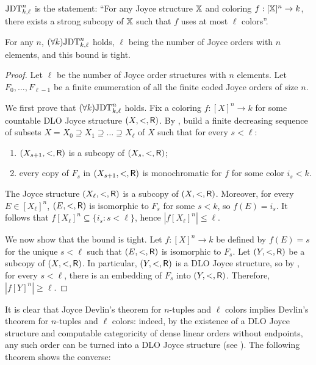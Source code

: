 \begin{statement}
  $\mathrm{JDT}^{n}_{k, \ell}$ is the statement: ``For any Joyce structure $\mathbb{X}$ and coloring $f: [\mathbb{X}]^n \to k$, there exists a strong subcopy of $\mathbb{X}$ such that $f$ uses at most $\ell$ colors''.
\end{statement}

\begin{corollary}\label{cor:strong-devlin-tight-joyce-orders}
  For any $n$, $(\forall k)\mathrm{JDT}^{n}_{k, \ell}$ holds, $\ell$ being the number of Joyce orders with $n$ elements, and this bound is tight.
\end{corollary}
\begin{proof}
Let $\ell$ be the number of Joyce order structures with $n$ elements. Let $F_0, \dots, F_{\ell-1}$ be a finite enumeration of all the finite coded Joyce orders of size $n$.

We first prove that $(\forall k)\mathrm{JDT}^{n}_{k, \ell}$ holds.
Fix a coloring $f: [X]^n \to k$ for some countable DLO Joyce structure $(X, <, \mathsf{R})$. By , build a finite decreasing sequence of subsets $X = X_0 \supseteq X_1 \supseteq \dots \supseteq X_\ell$ of $X$ such that for every $s < \ell$:
\begin{enumerate}
	\item $(X_{s+1},  <, \mathsf{R})$ is a subcopy of $(X_s, <, \mathsf{R})$;
	\item every copy of $F_s$ in $(X_{s+1},  <, \mathsf{R})$ is monochromatic for $f$ for some color $i_s < k$.
\end{enumerate}
The Joyce structure $(X_\ell, <, \mathsf{R})$ is a subcopy of $(X, <, \mathsf{R})$.
Moreover, for every $E \in [X_\ell]^n$, $(E, <, \mathsf{R})$ is isomorphic to $F_s$ for some $s < k$,
so $f(E) = i_s$. It follows that $f[X_\ell]^n \subseteq \{ i_s: s < \ell \}$, hence $|f[X_\ell]^n| \leq \ell$.

We now show that the bound is tight. Let $f: [X]^n \to k$ be defined by $f(E) = s$ for the unique $s < \ell$ such that $(E, <, \mathsf{R})$ is isomorphic to $F_s$.
Let $(Y, <, \mathsf{R})$ be a subcopy of $(X, <, \mathsf{R})$. In particular, $(Y, <, \mathsf{R})$ is a DLO Joyce structure, so by , for every $s < \ell$, there is an embedding of $F_s$ into $(Y, <, \mathsf{R})$. Therefore, $|f[Y]^n| \geq \ell$.
\end{proof}


It is clear that Joyce Devlin's theorem for $n$-tuples and $\ell$ colors implies Devlin's theorem for $n$-tuples and $\ell$ colors: indeed, by the existence of a DLO Joyce structure and computable categoricity of dense linear orders without endpoints, any such order can be turned into a DLO Joyce structure (see ). The following theorem shows the converse:

